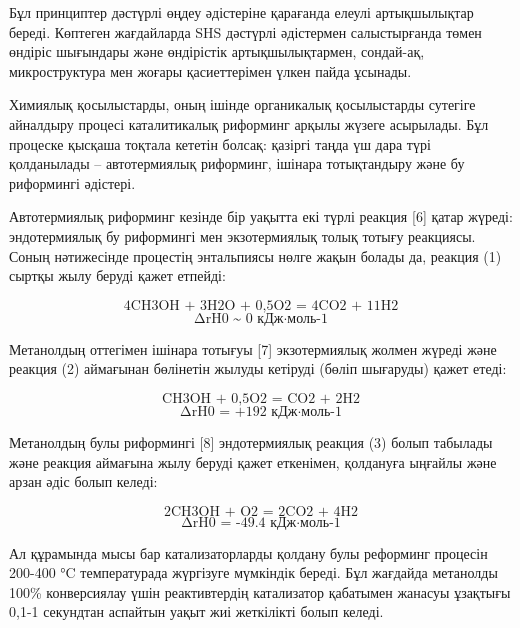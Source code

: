 \begin{multicols}{2}
Бұл принциптер дәстүрлі өңдеу әдістеріне қарағанда елеулі артықшылықтар
береді. Көптеген жағдайларда SHS дәстүрлі әдістермен салыстырғанда төмен
өндіріс шығындары және өндірістік артықшылықтармен, сондай-ақ,
микроструктура мен жоғары қасиеттерімен үлкен пайда ұсынады.

Химиялық қосылыстарды, оның ішінде органикалық қосылыстарды сутегіге
айналдыру процесі каталитикалық риформинг арқылы жүзеге асырылады. Бұл
процеске қысқаша тоқтала кететін болсақ: қазіргі таңда үш дара түрі
қолданылады -- автотермиялық риформинг, ішінара тотықтандыру және бу
риформингі әдістері.

Автотермиялық риформинг кезінде бір уақытта екі түрлі реакция {[}6{]}
қатар жүреді: эндотермиялық бу риформингі мен экзотермиялық толық тотығу
реакциясы. Соның нәтижесінде процестің энтальпиясы нөлге жақын болады
да, реакция (1) сыртқы жылу беруді қажет етпейді:

\begin{equation}
\text{4CH3OH + 3H2O + 0,5O2 = 4CO2 + 11H2}
\end{equation}
\begin{equation*}
\text{∆rH0 \textasciitilde{} 0 кДж·моль-1}
\end{equation*}

Метанолдың оттегімен ішінара тотығуы {[}7{]} экзотермиялық жолмен жүреді
және реакция (2) аймағынан бөлінетін жылуды кетіруді (бөліп шығаруды)
қажет етеді:

\begin{equation}
\text{CH3OH + 0,5O2 = CO2 + 2H2}
\end{equation}
\begin{equation*}
\text{∆rH0 = +192 кДж·моль-1}
\end{equation*}

Метанолдың булы риформингі {[}8{]} эндотермиялық реакция (3) болып
табылады және реакция аймағына жылу беруді қажет еткенімен, қолдануға
ыңғайлы және арзан әдіс болып келеді:

\begin{equation}
\text{2CH3OH + O2 = 2CO2 + 4H2}
\end{equation}
\begin{equation*}
\text{∆rH0 = -49.4 кДж·моль-1}
\end{equation*}

Ал құрамында мысы бар катализаторларды қолдану булы реформинг процесін
200-400 °C температурада жүргізуге мүмкіндік береді. Бұл жағдайда
метанолды 100\% конверсиялау үшін реактивтердің катализатор қабатымен
жанасуы ұзақтығы 0,1-1 секундтан аспайтын уақыт жиі жеткілікті болып
келеді.


\end{multicols}
